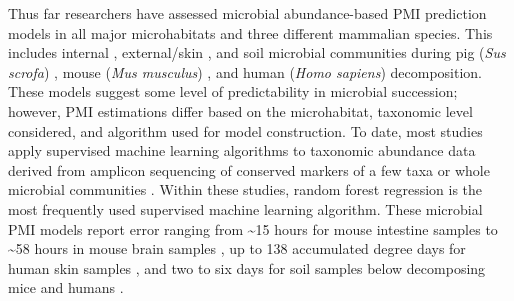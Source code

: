 \documentclass[
  10pt,
  letterpaper,
]{article}
\begin{document}
Thus far researchers have assessed microbial abundance-based PMI
prediction models in all major microhabitats and three different
mammalian species. This includes internal
\citep{liu_predicting_2020, hu_predicting_2021}, external/skin
\citep{pechal_potential_2014, johnson_machine_2016, metcalf_microbial_2016, belk_microbiome_2018, burcham_conserved_2024},
and soil \citep{belk_microbiome_2018, burcham_conserved_2024} microbial
communities during pig (\emph{Sus scrofa})
\citep{pechal_potential_2014}, mouse (\emph{Mus musculus})
\citep{metcalf_microbial_2016, liu_predicting_2020, belk_microbiome_2018},
and human (\emph{Homo sapiens})
\citep{johnson_machine_2016, metcalf_microbial_2016, hu_predicting_2021, belk_microbiome_2018, burcham_conserved_2024}
decomposition. These models suggest some level of predictability in
microbial succession; however, PMI estimations differ based on the
microhabitat, taxonomic level considered, and algorithm used for model
construction. To date, most studies apply supervised machine learning
algorithms to taxonomic abundance data derived from amplicon sequencing
of conserved markers of a few taxa \citep{pechal_potential_2014} or
whole microbial communities
\citep{johnson_machine_2016, metcalf_microbial_2016, liu_predicting_2020, hu_predicting_2021, belk_microbiome_2018, burcham_conserved_2024}.
Within these studies, random forest regression is the most frequently
used supervised machine learning algorithm. These microbial PMI models
report error ranging from \textasciitilde15 hours for mouse intestine
samples to \textasciitilde58 hours in mouse brain samples
\citep{liu_predicting_2020}, up to 138 accumulated degree days for human
skin samples \citep{johnson_machine_2016}, and two to six days for soil
samples below decomposing mice and humans \citep{belk_microbiome_2018}.
\end{document}
